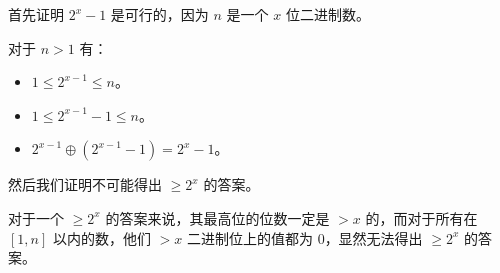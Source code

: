 \begin{frame}

首先证明 $2^x - 1$ 是可行的，因为 $n$ 是一个 $x$ 位二进制数。

对于 $n > 1$ 有：
\begin{itemize}
    \item $1\leq 2^{x - 1}\leq n$。
    \item $1\leq 2^{x - 1} - 1\leq n$。
    \item $2^{x - 1} \oplus (2^{x - 1} - 1) = 2^x - 1$。
\end{itemize}

然后我们证明不可能得出 $\geq 2^x$ 的答案。

对于一个 $\geq 2^x$ 的答案来说，其最高位的位数一定是 $> x$ 的，而对于所有在 $[1,
n]$ 以内的数，他们 $>x$ 二进制位上的值都为 $0$，显然无法得出 $\geq 2^x$ 的答案。

\end{frame}
